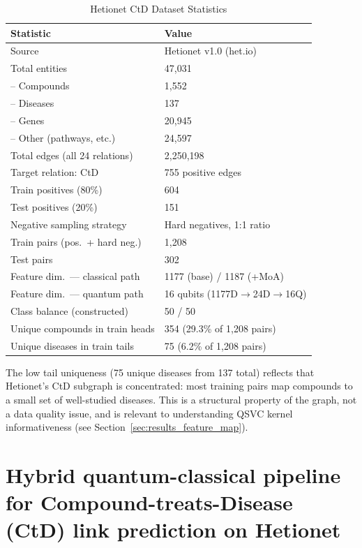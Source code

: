 \documentclass[twocolumn,10pt]{article}
\begin{document}
\begin{table}[t]
\centering
\caption{Hetionet CtD Dataset Statistics}
\label{tab:dataset}
\begin{tabular}{@{}ll@{}}
\toprule
\textbf{Statistic} & \textbf{Value} \\
\midrule
Source & Hetionet v1.0 (het.io) \\
Total entities & 47,031 \\
\quad-- Compounds & 1,552 \\
\quad-- Diseases & 137 \\
\quad-- Genes & 20,945 \\
\quad-- Other (pathways, etc.) & 24,597 \\
Total edges (all 24 relations) & 2,250,198 \\
Target relation: CtD & 755 positive edges \\
Train positives (80\%) & 604 \\
Test positives (20\%) & 151 \\
Negative sampling strategy & Hard negatives, 1:1 ratio \\
Train pairs (pos.\ + hard neg.) & 1,208 \\
Test pairs & 302 \\
Feature dim.\ --- classical path & 1177 (base) / 1187 (+MoA) \\
Feature dim.\ --- quantum path & 16 qubits (1177D$\to$24D$\to$16Q) \\
Class balance (constructed) & 50 / 50 \\
Unique compounds in train heads & 354 (29.3\% of 1,208 pairs) \\
Unique diseases in train tails & 75 (6.2\% of 1,208 pairs) \\
\bottomrule
\end{tabular}
\end{table}

The low tail uniqueness (75 unique diseases from 137 total) reflects that Hetionet's CtD subgraph is concentrated: most training pairs map compounds to a small set of well-studied diseases. This is a structural property of the graph, not a data quality issue, and is relevant to understanding QSVC kernel informativeness (see Section~\ref{sec:results_feature_map}).

\FloatBarrier
\section{Hybrid quantum-classical pipeline for Compound-treats-Disease (CtD) link prediction on Hetionet}
\end{document}
